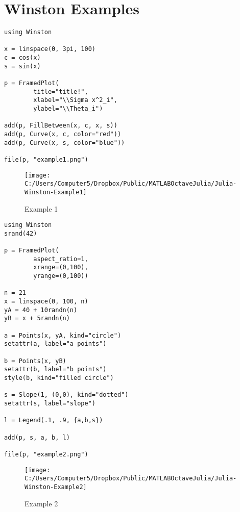 \documentclass[12pt]{article}
\begin{document}
\section{Winston Examples}
\begin{framed}
\begin{verbatim}
using Winston

x = linspace(0, 3pi, 100)
c = cos(x)
s = sin(x)

p = FramedPlot(
        title="title!",
        xlabel="\\Sigma x^2_i",
        ylabel="\\Theta_i")

add(p, FillBetween(x, c, x, s))
add(p, Curve(x, c, color="red"))
add(p, Curve(x, s, color="blue"))

file(p, "example1.png")
\end{verbatim}
\end{framed}
\begin{figure}[h!]
\centering
\texttt{[image: C:/Users/Computer5/Dropbox/Public/MATLABOctaveJulia/Julia-Winston-Example1]}
\caption{Example 1}
\label{fig:Julia-Winston-Example1}
\end{figure}
\newpage
\begin{framed}
\begin{verbatim}
using Winston
srand(42)

p = FramedPlot(
        aspect_ratio=1,
        xrange=(0,100),
        yrange=(0,100))

n = 21
x = linspace(0, 100, n)
yA = 40 + 10randn(n)
yB = x + 5randn(n)

a = Points(x, yA, kind="circle")
setattr(a, label="a points")

b = Points(x, yB)
setattr(b, label="b points")
style(b, kind="filled circle")

s = Slope(1, (0,0), kind="dotted")
setattr(s, label="slope")

l = Legend(.1, .9, {a,b,s})

add(p, s, a, b, l)

file(p, "example2.png")
\end{verbatim}
\end{framed}
\begin{figure}[h!]
\centering
\texttt{[image: C:/Users/Computer5/Dropbox/Public/MATLABOctaveJulia/Julia-Winston-Example2]}
\caption{Example 2}
\label{fig:Julia-Winston-Example2}
\end{figure}
\end{document}
